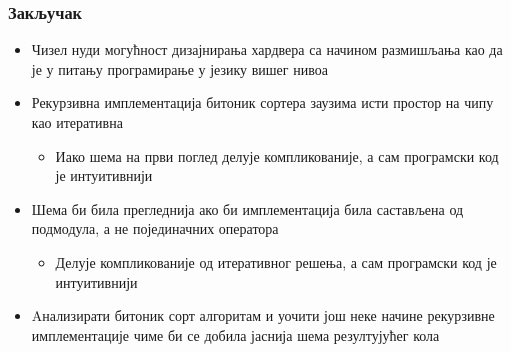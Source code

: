 \begin{frame}
\frametitle{Закључак}
\begin{itemize}
 \item Чизел нуди могућност дизајнирања хардвера са начином размишљања као да је у питању програмирање у језику вишег нивоа
 \item Рекурзивна имплементација битоник сортера заузима исти простор на чипу као итеративна
 \begin{itemize}
  \item Иако шема на први поглед делује компликованије, а сам програмски код је интуитивнији
 \end{itemize}
 \item Шема би била прегледнија ако би имплементација била састављена од подмодула, а не појединачних оператора
 \begin{itemize}
  \item Делује компликованије од итеративног решења, а сам програмски код је интуитивнији
 \end{itemize}
 \item Aнализирати битоник сорт алгоритам и уочити још неке начине рекурзивне имплементације чиме би се добила јаснија шема резултујућег кола
\end{itemize}
\end{frame}

%
%
%
%
%
%
%
%



